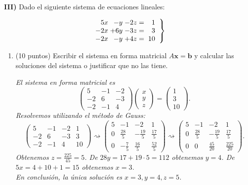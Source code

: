 \documentclass[12pt,a4paper]{amsart}
\newcommand{\pr}[1]{\vspace{0.1cm}\hspace*{0.1cm} \textbf{#1) }}
\begin{document}
\newpage
\pr{III}  Dado el siguiente sistema de ecuaciones lineales:


$$\left. \begin{array} {r@{\hspace{1mm}}r@{\hspace{1mm}}r@{\hspace{1mm}}r@{\hspace{2mm}}r@{\hspace{2mm}}r}
5 x      & - y & -2 z   &=&1 \\
-2x & +6y & -3z       &=& 3 \\
-2 x&  -y           &+ 4 z   &=& 10
\end{array}\right\}$$

\renewcommand{\labelenumi}{\alph{enumi}$)$ }
\begin{enumerate}
\item (10 puntos) Escribir el sistema en forma matricial $A \mathbf{x} = \mathbf{b}$ y calcular 
las soluciones del sistema o justificar que no las tiene. 

\vskip 0.5cm
\emph{El sistema en forma matricial es 
$$\left(\begin{array}{ccc}5 & -1 & -2 \\-2 & 6 & -3 \\-2 & -1 & 4\end{array}\right)
\left(\begin{array}{c} x\\  y\\z   \end{array}\right)=
\left(\begin{array}{c} 1\\  3\\10   \end{array}\right).$$
Resolvemos utilizando el m\'etodo de Gauss:
$$\left(\begin{array}{ccc|c}5 & -1 & -2 &1\\-2 & 6 & -3 &3\\-2 & -1 & 4&10\end{array}\right)\rightsquigarrow
\left(\begin{array}{ccc|c}5 & -1 & -2 &1\\0 & \frac{28}{5} & -\frac{19}{5} &\frac{17}{5}\\0 & -\frac{7}{5} & \frac{16}{5}&\frac{52}{5}\end{array}\right)\rightsquigarrow
\left(\begin{array}{ccc|c}5 & -1 & -2 &1\\0 & \frac{28}{5} & -\frac{19}{5} &\frac{17}{5}\\0 & 0 & \frac{45}{20}&\frac{225}{20}\end{array}\right).$$
Obtenemos $z=\frac{225}{45}=5$. De $28y=17+19\cdot 5=112$ obtenemos $y=4$. De $5x=4+10+1=15$ obtenemos $x=3$.\\
En conclusi\'on, la \'unica soluci\'on es $x=3,y=4,z=5$.
}
\newpage


\end{enumerate}
\end{document}
